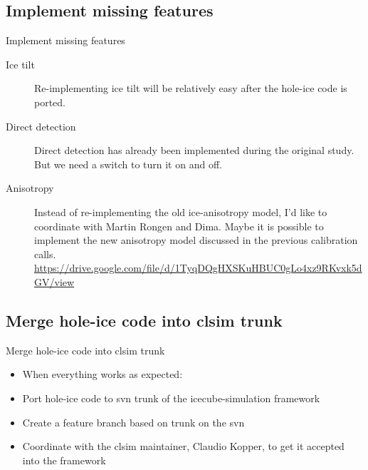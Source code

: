 \subsection{\tobedone Implement missing features}
\begin{frame}{\tobedone Implement missing features}
  \begin{description}
    \item[Ice tilt] Re-implementing ice tilt will be relatively easy after the hole-ice code is ported.
    \item[Direct detection] Direct detection has already been implemented during the original study. But we need a switch to turn it on and off.
    \item[Anisotropy] Instead of re-implementing the old ice-anisotropy model, I'd like to coordinate with Martin Rongen and Dima. Maybe it is possible to implement the new anisotropy model discussed in the previous calibration calls. \url{https://drive.google.com/file/d/1TyqDQgHXSKuHBUC0gLo4xz9RKvxk5dGV/view}
  \end{description}
\end{frame}

\subsection{\tobedone Merge hole-ice code into clsim trunk}
\begin{frame}{\tobedone Merge hole-ice code into clsim trunk}
  \begin{itemize}
    \item When everything works as expected:
    \item[\tobedone] Port hole-ice code to svn trunk of the icecube-simulation framework
    \item[\tobedone] Create a feature branch based on trunk on the svn
    \item[\tobedone] Coordinate with the clsim maintainer, Claudio Kopper, to get it accepted into the framework
  \end{itemize}
\end{frame}
